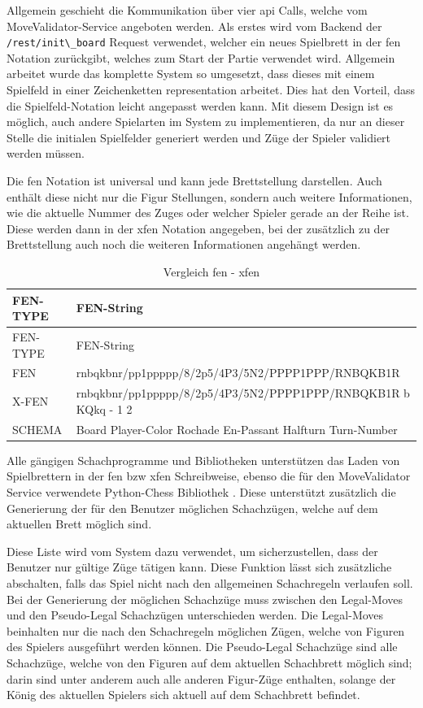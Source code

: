 Allgemein geschieht die Kommunikation über vier \gls{api} Calls, welche
vom MoveValidator-Service angeboten werden. Als erstes wird vom Backend
der \passthrough{\lstinline!/rest/init\_board!} Request verwendet,
welcher ein neues Spielbrett in der \gls{fen} Notation zurückgibt,
welches zum Start der Partie verwendet wird. Allgemein arbeitet wurde
das komplette System so umgesetzt, dass dieses mit einem Spielfeld in
einer Zeichenketten representation arbeitet. Dies hat den Vorteil, dass
die Spielfeld-Notation leicht angepasst werden kann. Mit diesem Design
ist es möglich, auch andere Spielarten im System zu implementieren, da
nur an dieser Stelle die initialen Spielfelder generiert werden und Züge
der Spieler validiert werden müssen.

Die \gls{fen} Notation ist universal und kann jede Brettstellung
darstellen. Auch enthält diese nicht nur die Figur Stellungen, sondern
auch weitere Informationen, wie die aktuelle Nummer des Zuges oder
welcher Spieler gerade an der Reihe ist. Diese werden dann in der
\gls{xfen} Notation angegeben, bei der zusätzlich zu der Brettstellung
auch noch die weiteren Informationen angehängt werden.

\begin{longtable}[]{@{}ll@{}}
\caption{Vergleich \gls{fen} - \gls{xfen}}\tabularnewline
\toprule
FEN-TYPE & FEN-String\tabularnewline
\midrule
\endfirsthead
\toprule
FEN-TYPE & FEN-String\tabularnewline
\midrule
\endhead
FEN & rnbqkbnr/pp1ppppp/8/2p5/4P3/5N2/PPPP1PPP/RNBQKB1R\tabularnewline
X-FEN & rnbqkbnr/pp1ppppp/8/2p5/4P3/5N2/PPPP1PPP/RNBQKB1R b KQkq - 1
2\tabularnewline
SCHEMA & Board Player-Color Rochade En-Passant Halfturn
Turn-Number\tabularnewline
\bottomrule
\end{longtable}

Alle gängigen Schachprogramme und Bibliotheken unterstützen das Laden
von Spielbrettern in der \gls{fen} bzw \gls{xfen} Schreibweise, ebenso
die für den MoveValidator Service verwendete Python-Chess Bibliothek
\cite{pythonchesslib}. Diese unterstützt zusätzlich die Generierung
der für den Benutzer möglichen Schachzügen, welche auf dem aktuellen
Brett möglich sind.

Diese Liste wird vom System dazu verwendet, um sicherzustellen, dass der
Benutzer nur gültige Züge tätigen kann. Diese Funktion lässt sich
zusätzliche abschalten, falls das Spiel nicht nach den allgemeinen
Schachregeln verlaufen soll. Bei der Generierung der möglichen
Schachzüge muss zwischen den Legal-Moves und den Pseudo-Legal
Schachzügen unterschieden werden. Die Legal-Moves beinhalten nur die
nach den Schachregeln möglichen Zügen, welche von Figuren des Spielers
ausgeführt werden können. Die Pseudo-Legal Schachzüge sind alle
Schachzüge, welche von den Figuren auf dem aktuellen Schachbrett möglich
sind; darin sind unter anderem auch alle anderen Figur-Züge enthalten,
solange der König des aktuellen Spielers sich aktuell auf dem
Schachbrett befindet.

